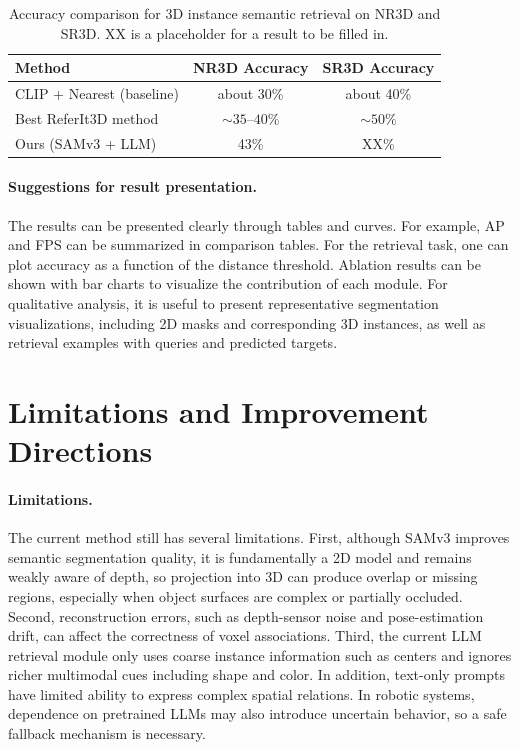 \documentclass[12pt,a4paper]{article}
\begin{document}
\begin{table}[H]
\centering
\small
\begin{tabular}{lcc}
\toprule
Method & NR3D Accuracy & SR3D Accuracy \\
\midrule
CLIP + Nearest (baseline) & about 30\% & about 40\% \\
Best ReferIt3D method & $\sim 35$--$40\%$ & $\sim 50\%$ \\
Ours (SAMv3 + LLM) & 43\% & XX\% \\
\bottomrule
\end{tabular}
\caption{Accuracy comparison for 3D instance semantic retrieval on NR3D and SR3D. XX is a placeholder for a result to be filled in.}
\label{tab:retrieval_results}
\end{table}

\paragraph{Suggestions for result presentation.}
The results can be presented clearly through tables and curves. For example, AP and FPS can be summarized in comparison tables. For the retrieval task, one can plot accuracy as a function of the distance threshold. Ablation results can be shown with bar charts to visualize the contribution of each module. For qualitative analysis, it is useful to present representative segmentation visualizations, including 2D masks and corresponding 3D instances, as well as retrieval examples with queries and predicted targets.

\section{Limitations and Improvement Directions}

\paragraph{Limitations.}
The current method still has several limitations. First, although SAMv3 improves semantic segmentation quality, it is fundamentally a 2D model and remains weakly aware of depth, so projection into 3D can produce overlap or missing regions, especially when object surfaces are complex or partially occluded. Second, reconstruction errors, such as depth-sensor noise and pose-estimation drift, can affect the correctness of voxel associations. Third, the current LLM retrieval module only uses coarse instance information such as centers and ignores richer multimodal cues including shape and color. In addition, text-only prompts have limited ability to express complex spatial relations. In robotic systems, dependence on pretrained LLMs may also introduce uncertain behavior, so a safe fallback mechanism is necessary.
\end{document}
